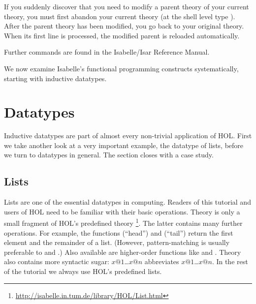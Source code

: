 \begin{description}
  If you suddenly discover that you need to modify a parent theory of your
  current theory, you must first abandon your current theory (at the shell
  level type ). After the parent theory has
  been modified, you go back to your original theory. When its first line
   is processed, the
  modified parent is reloaded automatically.
  
\end{description}
Further commands are found in the Isabelle/Isar Reference Manual.

We now examine Isabelle's functional programming constructs systematically,
starting with inductive datatypes.


\section{Datatypes}
\label{sec:datatype}

Inductive datatypes are part of almost every non-trivial application of HOL.
First we take another look at a very important example, the datatype of
lists, before we turn to datatypes in general. The section closes with a
case study.


\subsection{Lists}

Lists are one of the essential datatypes in computing. Readers of this
tutorial and users of HOL need to be familiar with their basic operations.
Theory  is only a small fragment of HOL's predefined theory
\footnote{\url{http://isabelle.in.tum.de/library/HOL/List.html}}.
The latter contains many further operations. For example, the functions
 (``head'') and  (``tail'') return the first
element and the remainder of a list. (However, pattern-matching is usually
preferable to  and .)  
Also available are higher-order functions like  and .
Theory  also contains
more syntactic sugar: \isa{[}$x@1$\isa{,}\dots\isa{,}$x@n$\isa{]} abbreviates
$x@1$\isa{\#}\dots\isa{\#}$x@n$\isa{\#[]}.  In the rest of the tutorial we
always use HOL's predefined lists.


